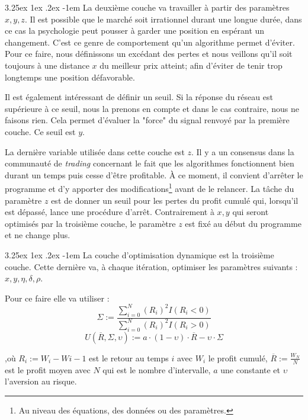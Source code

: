 \documentclass[a4paper, 11pt]{article}
\makeatletter
\renewcommand\paragraph{\@startsection{paragraph}{5}{\z@}%
  {3.25ex \@plus1ex \@minus.2ex}%
  {-1em}%
  {\normalfont\normalsize\bfseries}}
\makeatother
\begin{document}
\paragraph{}
La deuxième couche va travailler à partir des paramètres $x,y,z$. Il est possible que le marché soit irrationnel durant une longue
durée, dans ce cas la psychologie peut pousser à garder une position en espérant un changement. C'est ce genre de comportement qu'un
algorithme permet d'éviter. Pour ce faire, nous définissons un excédant des pertes et nous veillons qu'il soit toujours à une distance
$x$ du meilleur prix atteint; afin d'éviter de tenir trop longtemps une position défavorable.

Il est également intéressant de définir un seuil. Si la réponse du réseau est supérieure à ce seuil, nous la prenons en compte et
dans le cas contraire, nous ne faisons rien. Cela permet d'évaluer la "force" du signal renvoyé par la première couche. Ce seuil
est $y$.

La dernière variable utilisée dans cette couche est $z$. Il y a un consensus dans la communauté de \textit{trading} concernant le fait
que les algorithmes fonctionnent bien durant un temps puis cesse d'être profitable. À ce moment, il convient d'arrêter le programme
et d'y apporter des modifications\footnote{Au niveau des équations, des données ou des paramètres.} avant de le relancer. La tâche du
paramètre $z$ est de donner un seuil pour les pertes du profit cumulé qui, lorsqu'il est dépassé, lance une procédure d'arrêt.
Contrairement à $x,y$ qui seront optimisés par la troisième couche, le paramètre $z$ est fixé au début du programme et ne change plus.

\paragraph{}
La couche d'optimisation dynamique est la troisième couche. Cette dernière va, à chaque itération, optimiser les paramètres suivants :
$x,y,\eta,\delta,\rho$.

Pour ce faire elle va utiliser \cite{fx_trading}:
$$\Sigma := \frac{\sum_{i=0}^N (R_i)^2 I(R_i < 0)}{\sum_{i=0}^N (R_i)^2 I(R_i > 0)}$$
$$ U(\overline{R},\Sigma,\upsilon) := a\cdot(1-\upsilon)\cdot \overline{R} - \upsilon \cdot \Sigma$$

,où $R_i := W_i - W{i-1}$ est le retour au temps $i$ avec $W_i$ le profit cumulé, $\overline{R} := \frac{W_N}{N}$ est le profit moyen
avec $N$ qui est le nombre d'intervalle, $a$ une constante et $\upsilon$ l'aversion au risque.
\end{document}
